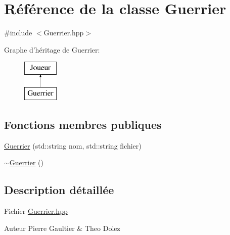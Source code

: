 \hypertarget{class_guerrier}{\section{\-Référence de la classe \-Guerrier}
\label{class_guerrier}
}


{\ttfamily \#include $<$\-Guerrier.\-hpp$>$}

\-Graphe d'héritage de \-Guerrier\-:\begin{figure}[H]
\begin{center}
\leavevmode
\includegraphics[height=2.000000cm]{class_guerrier}
\end{center}
\end{figure}
\subsection*{\-Fonctions membres publiques}
\begin{DoxyCompactItemize}
\item 
\hyperlink{class_guerrier_a08622f52e49c7fd2695ce215b3ad9aec}{\-Guerrier} (std\-::string nom, std\-::string fichier)
\item 
\hyperlink{class_guerrier_a83ec8ec6ced25a349249d0cdc70c75b6}{$\sim$\-Guerrier} ()
\end{DoxyCompactItemize}


\subsection{\-Description détaillée}
\-Fichier \hyperlink{_guerrier_8hpp}{\-Guerrier.\-hpp} \begin{DoxyAuthor}{\-Auteur}
\-Pierre \-Gaultier \& \-Theo \-Dolez 
\end{DoxyAuthor}


